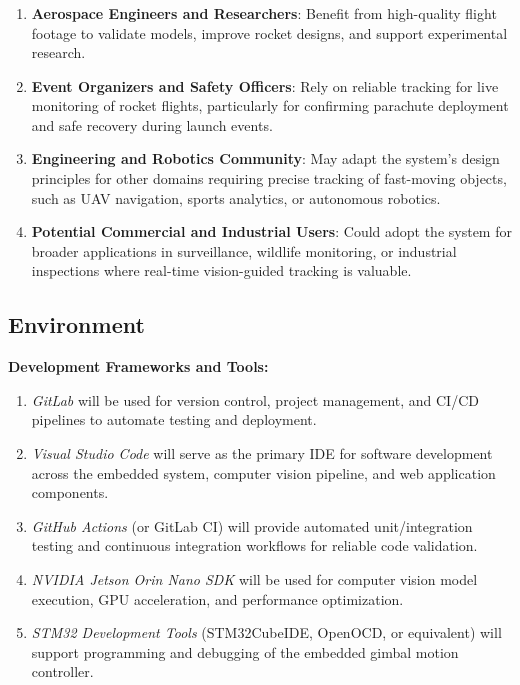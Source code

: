 \documentclass{article}
\begin{document}
\subsubsection*{\color{blue}{Indirect Stakeholders}}
\begin{enumerate}
    \item \textbf{Aerospace Engineers and Researchers}: Benefit from
          high-quality flight footage to validate models, improve rocket
          designs, and support experimental research.

    \item \textbf{Event Organizers and Safety Officers}: Rely on
          reliable tracking for live monitoring of rocket flights,
          particularly for confirming parachute deployment and safe
          recovery during launch events.

    \item \textbf{Engineering and Robotics Community}: May adapt the
          system’s design principles for other domains requiring precise
          tracking of fast-moving objects, such as UAV navigation, sports
          analytics, or autonomous robotics.

    \item \textbf{Potential Commercial and Industrial Users}: Could
          adopt the system for broader applications in surveillance,
          wildlife monitoring, or industrial inspections where real-time
          vision-guided tracking is valuable.
\end{enumerate}

\subsection{Environment}
\textbf{Development Frameworks and Tools:}
\begin{enumerate}

    \item \textit{GitLab} will be used for version control, project
          management, and CI/CD pipelines to automate testing and deployment.

    \item \textit{Visual Studio Code} will serve as the primary IDE for
          software development across the embedded system, computer vision
          pipeline, and web application components.

    \item \textit{GitHub Actions} (or GitLab CI) will provide automated
          unit/integration testing and continuous integration workflows for
          reliable code validation.

    \item \textit{NVIDIA Jetson Orin Nano SDK} will be used for
          computer vision model execution, GPU acceleration, and
          performance optimization.

    \item \textit{STM32 Development Tools} (STM32CubeIDE, OpenOCD, or
          equivalent) will support programming and debugging of the
          embedded gimbal motion controller.

\end{enumerate}
\end{document}
